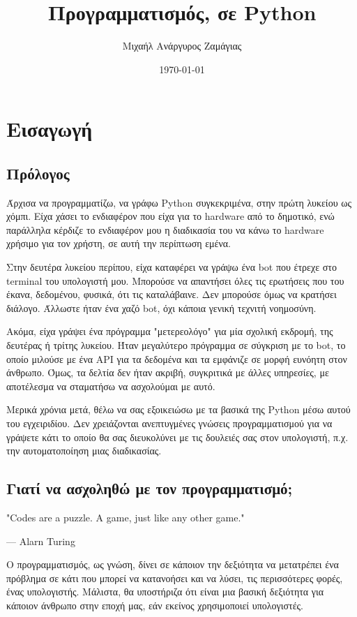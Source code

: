 \documentclass[a4paper,14pt]{extreport}
\title{Προγραμματισμός, σε Python}
\author{Μιχαήλ Ανάργυρος Ζαμάγιας}
\date{\today}
\begin{document}
\maketitle

\tableofcontents

\chapter{Εισαγωγή}
\newpage

\section{Πρόλογος}
Άρχισα να προγραμματίζω, να γράφω Python συγκεκριμένα, στην πρώτη λυκείου ως χόμπι. Είχα χάσει το ενδιαφέρον που είχα για το hardware από το δημοτικό, ενώ παράλληλα κέρδιζε το ενδιαφέρον μου η διαδικασία του να κάνω το hardware χρήσιμο για τον χρήστη, σε αυτή την περίπτωση εμένα.

Στην δευτέρα λυκείου περίπου, είχα καταφέρει να γράψω ένα bot που έτρεχε στο terminal του υπολογιστή μου. Μπορούσε να απαντήσει όλες τις ερωτήσεις που του έκανα, δεδομένου, φυσικά, ότι τις καταλάβαινε. Δεν μπορούσε όμως να κρατήσει διάλογο. Άλλωστε ήταν ένα χαζό bot, όχι κάποια γενική τεχνιτή νοημοσύνη.

Ακόμα, είχα γράψει ένα πρόγραμμα "μετερεολόγο" για μία σχολική εκδρομή, της δευτέρας ή τρίτης λυκείου. Ήταν μεγαλύτερο πρόγραμμα σε σύγκριση με το bot, το  οποίο μιλούσε με ένα API για τα δεδομένα και τα εμφάνιζε σε μορφή ευνόητη στον άνθρωπο. Όμως, τα δελτία δεν ήταν ακριβή, συγκριτικά με άλλες υπηρεσίες, με αποτέλεσμα να σταματήσω να ασχολούμαι με αυτό.

Μερικά χρόνια μετά, θέλω να σας εξοικειώσω με τα βασικά της Python μέσω αυτού του εγχειριδίου. Δεν χρειάζονται ανεπτυγμένες γνώσεις προγραμματισμού για να γράψετε κάτι το οποίο θα σας διευκολύνει με τις δουλειές σας στον υπολογιστή, π.χ. την αυτοματοποίηση μιας διαδικασίας.
\section{Γιατί να ασχοληθώ με τον προγραμματισμό;}

\epigraph{"Codes are a puzzle. A game, just like any other game."}{— Alarn Turing}
Ο προγραμματισμός, ως γνώση, δίνει σε κάποιον την δεξιότητα να
μετατρέπει ένα πρόβλημα σε κάτι που μπορεί να κατανοήσει και να λύσει,
τις περισσότερες φορές, ένας υπολογιστής. Μάλιστα, θα υποστήριζα ότι
είναι μια βασική δεξιότητα για κάποιον άνθρωπο στην εποχή μας,
εάν εκείνος χρησιμοποιεί υπολογιστές.
\end{document}
